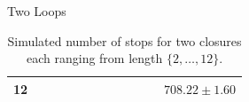 \documentclass[hyphens,aspectratio=169]{beamer}
\begin{document}
\begin{frame}[fragile]{Two Loops}
\begin{table}[H]
\begin{adjustbox}{max width=\textwidth}
\begin{tabular}{|c|c|c|c|c|c|c|c|c|c|c|c|}
				\hline
				12                &                   &                   &                   &                   &                   &                   &                   &                   &                   &                   & $708.22 \pm 1.60$ \\
				\hline
			\end{tabular}
		\end{adjustbox}
		\caption{Simulated number of stops for two closures each ranging
			from length $\{2,\dots,12\}$.}
	\end{table}

\end{frame}








\part{}
\end{document}
